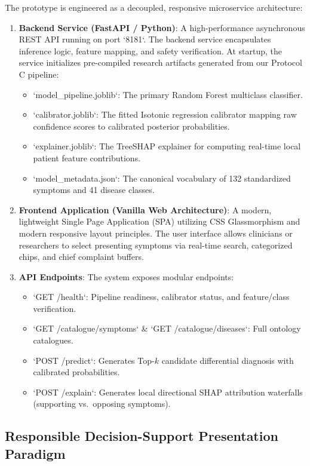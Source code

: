 The prototype is engineered as a decoupled, responsive microservice architecture:
\begin{enumerate}
    \item \textbf{Backend Service (FastAPI / Python)}: A high-performance asynchronous REST API running on port `8181`. The backend service encapsulates inference logic, feature mapping, and safety verification. At startup, the service initializes pre-compiled research artifacts generated from our Protocol C pipeline:
    \begin{itemize}
        \item `model_pipeline.joblib`: The primary Random Forest multiclass classifier.
        \item `calibrator.joblib`: The fitted Isotonic regression calibrator mapping raw confidence scores to calibrated posterior probabilities.
        \item `explainer.joblib`: The TreeSHAP explainer for computing real-time local patient feature contributions.
        \item `model_metadata.json`: The canonical vocabulary of 132 standardized symptoms and 41 disease classes.
    \end{itemize}
    \item \textbf{Frontend Application (Vanilla Web Architecture)}: A modern, lightweight Single Page Application (SPA) utilizing CSS Glassmorphism and modern responsive layout principles. The user interface allows clinicians or researchers to select presenting symptoms via real-time search, categorized chips, and chief complaint buffers.
    \item \textbf{API Endpoints}: The system exposes modular endpoints:
    \begin{itemize}
        \item `GET /health`: Pipeline readiness, calibrator status, and feature/class verification.
        \item `GET /catalogue/symptoms` \& `GET /catalogue/diseases`: Full ontology catalogues.
        \item `POST /predict`: Generates Top-$k$ candidate differential diagnosis with calibrated probabilities.
        \item `POST /explain`: Generates local directional SHAP attribution waterfalls (supporting vs.\ opposing symptoms).
    \end{itemize}
\end{enumerate}

\subsection{Responsible Decision-Support Presentation Paradigm}
\label{subsec:prototype_presentation}

